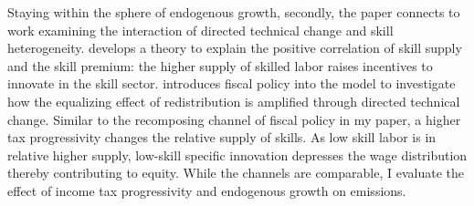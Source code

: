 


Staying within the sphere of endogenous growth, secondly, the paper connects to work examining the interaction of directed technical change and skill heterogeneity. \cite{Acemoglu2002DirectedChange} develops a theory to explain the positive correlation of skill supply and the skill premium: the higher supply of skilled labor raises incentives to innovate in the skill sector. \cite{Loebbing2019NationalChange} introduces fiscal policy into the model to investigate how the equalizing effect of redistribution is amplified through directed technical change. Similar to the recomposing channel of fiscal policy in my paper, a higher tax progressivity changes the relative supply of skills. As low skill labor is in relative higher supply, low-skill specific innovation depresses the wage distribution thereby contributing to equity. While the channels are comparable, I evaluate the effect of income tax progressivity and endogenous growth on emissions. 


